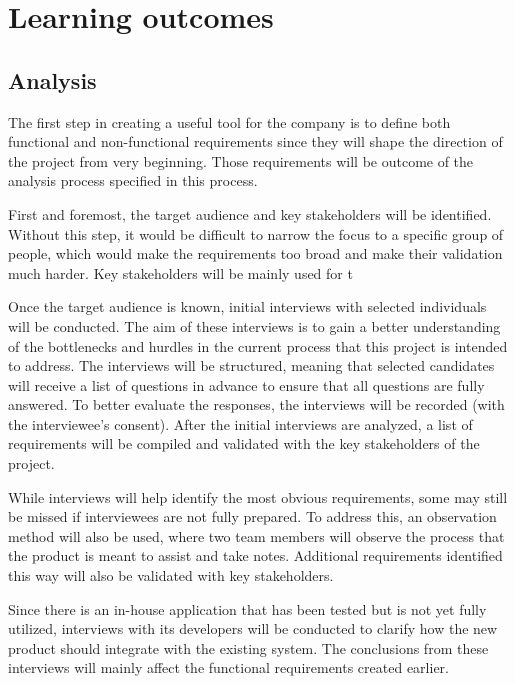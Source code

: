 \section{Learning outcomes}
\label{sec:Learngin-Outcomes}

\subsection{Analysis}
\label{subsec:Analysis}

The first step in creating a useful tool for the company is to define both functional and non-functional requirements since they will shape the direction of the project from very beginning. Those requirements will be outcome of the analysis process specified in this process. 

First and foremost, the target audience and key stakeholders will be identified. Without this step, it would be difficult to narrow the focus to a specific group of people, which would make the requirements too broad and make their validation much harder. Key stakeholders will be mainly used for t

Once the target audience is known, initial interviews with selected individuals will be conducted. The aim of these interviews is to gain a better understanding of the bottlenecks and hurdles in the current process that this project is intended to address. The interviews will be structured, meaning that selected candidates will receive a list of questions in advance to ensure that all questions are fully answered. To better evaluate the responses, the interviews will be recorded (with the interviewee’s consent). After the initial interviews are analyzed, a list of requirements will be compiled and validated with the key stakeholders of the project.

While interviews will help identify the most obvious requirements, some may still be missed if interviewees are not fully prepared. To address this, an observation method will also be used, where two team members will observe the process that the product is meant to assist and take notes. Additional requirements identified this way will also be validated with key stakeholders.

Since there is an in-house application that has been tested but is not yet fully utilized, interviews with its developers will be conducted to clarify how the new product should integrate with the existing system. The conclusions from these interviews will mainly affect the functional requirements created earlier.

